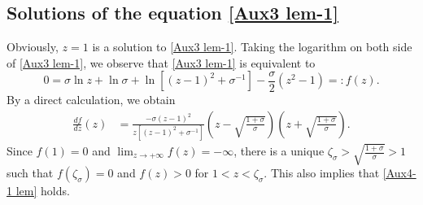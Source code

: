 \documentclass{amsart}
\newcommand{\veps}{\varepsilon}
\numberwithin{equation}{section}
\theoremstyle{plain}%
\theoremstyle{definition}
\theoremstyle{remark}
\theoremstyle{remark}
\begin{document}
\subsection{Solutions of the equation \eqref{Aux3 lem-1}}
Obviously, $z=1$ is a solution to \eqref{Aux3 lem-1}. Taking the logarithm on both side of \eqref{Aux3 lem-1}, we observe that \eqref{Aux3 lem-1} is equivalent to 
\[
0=\sigma \ln z + \ln \sigma + \ln \left[(z-1)^2 + \sigma^{-1}\right]-\frac{\sigma}{2}\left(z^2-1 \right)=:f(z).
\]
By a direct calculation, we obtain
\[
\begin{split}
\frac{df}{dz}(z)
& = \frac{-\sigma(z-1)^2}{z\left[(z-1)^2 + \sigma^{-1} \right]}\left(z-\sqrt{\frac{1+\sigma}{\sigma}} \right)\left(z+\sqrt{\frac{1+\sigma}{\sigma}} \right).
\end{split}
\]
Since $f(1)=0$ and $\lim_{z \to +\infty}f(z) = -\infty$, there is a unique $\zeta_{\sigma}>\sqrt{\frac{1 + \sigma}{\sigma}}>1$ such that $f(\zeta_{\sigma})=0$ and $f(z) > 0$ for $1<z < \zeta_{\sigma}.$ This also implies that \eqref{Aux4-1 lem} holds.



\end{document}
